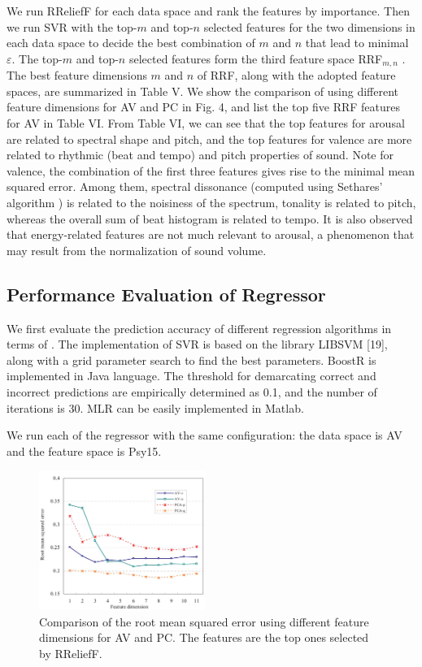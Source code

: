 \documentclass[journal, twoside]{IEEEtran}
\begin{document}
We run RReliefF for each data space and rank the features
by importance. Then we run SVR with the top-$m$ and top-$n$ selected features for the two dimensions in each data space to
decide the best combination of $m$ and $n$ that lead to minimal $\varepsilon$. The top-$m$ and top-$n$ selected features form the third feature space RRF$_{m,n}$ . The best feature dimensions $m$ and $n$ of
RRF, along with the adopted feature spaces, are summarized in
Table V. We show the comparison of using different feature dimensions for AV and PC in Fig. 4, and list the top five RRF features for AV in Table VI. From Table VI, we can see that the top
features for arousal are related to spectral shape and pitch, and
the top features for valence are more related to rhythmic (beat
and tempo) and pitch properties of sound. Note for valence, the
combination of the first three features gives rise to the minimal
mean squared error. Among them, spectral dissonance (computed using Sethares’ algorithm \cite{27}) is related to the noisiness
of the spectrum, tonality is related to pitch, whereas the overall
sum of beat histogram is related to tempo. It is also observed
that energy-related features are not much relevant to arousal, a
phenomenon that may result from the normalization of sound
volume.

\subsection{Performance Evaluation of Regressor}
We first evaluate the prediction accuracy of different regression algorithms in terms of . The implementation of SVR is based on the library LIBSVM [19], along with a grid parameter search to find the best parameters. BoostR is implemented in Java language. The threshold for demarcating correct and incorrect predictions are empirically determined as 0.1, and the
number of iterations is 30. MLR can be easily implemented in
Matlab.

We run each of the regressor with the same configuration:
the data space is AV and the feature space is Psy15.

\begin{figure}[h]
\centering
\captionsetup{justification=centering}
\includegraphics[width=0.48\textwidth, height=0.40\textwidth]{fig4.png}
\caption{Comparison of the root mean squared error using different feature dimensions for AV and PC. The features are the top ones selected by RReliefF.}
\label{fig3}
\end{figure}
\vspace{.5cm}
\end{document}
